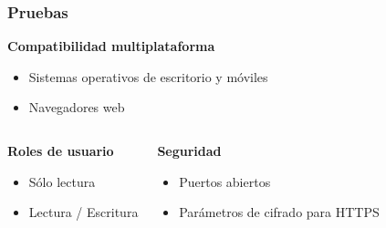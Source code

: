 \documentclass{beamer}
\begin{document}

\begin{frame}
\frametitle{Pruebas}
\justifying

\begin{block}{\textbf{Compatibilidad multiplataforma}}
 \begin{itemize}
  \item Sistemas operativos de escritorio y m\'{o}viles
  \item Navegadores web
 \end{itemize}
\end{block}

\begin{columns}[c] 

\begin{block}{\textbf{Roles de usuario}}
 \begin{itemize}
  \item S\'{o}lo lectura
  \item Lectura / Escritura
 \end{itemize}
\end{block}

\begin{block}{\textbf{Seguridad}}
 \begin{itemize}
  \item Puertos abiertos
  \item Par\'{a}metros de cifrado para \textup{HTTPS}
 \end{itemize}
\end{block}

\end{columns}

\end{frame}

%
% 
% 
%
% 
\end{document}
